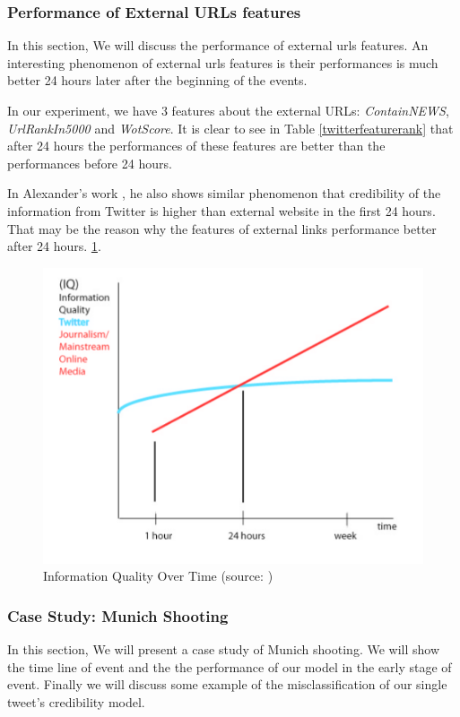   \subsubsection{Performance of External URLs features}
  In this section, We will discuss the performance of external urls features. An interesting phenomenon of  external urls features is their performances is much better 24 hours later after the beginning of the events.
  
  In our experiment, we have 3 features about the external URLs: \emph{ContainNEWS}, \emph{UrlRankIn5000} and \emph{WotScore}. It is clear to see in Table \ref{twitterfeaturerank} that after 24 hours the performances of these features are better than the performances before 24 hours.    
  
  In Alexander's work \cite{mills2009web}, he also shows similar phenomenon that credibility of the information from Twitter is higher than external website in the first 24 hours. That may be the reason why the features of external links performance better after 24 hours.
\ref{fig:informationqulitat}. 
  \begin{figure}[!h]
\centering
\includegraphics[width=0.7\columnwidth]{images/Informationqulitat.png}
\caption{Information Quality Over Time (source: \cite{mills2009web})}
\label{fig:informationqulitat}
\end{figure}
\newpage
 \subsubsection{Case Study: Munich Shooting } 
 In this section, We will present a case study of Munich shooting. We will show the time line of event and the the performance of our model in the early stage of event. Finally we will discuss some example of the misclassification of our single tweet's credibility model.
 
